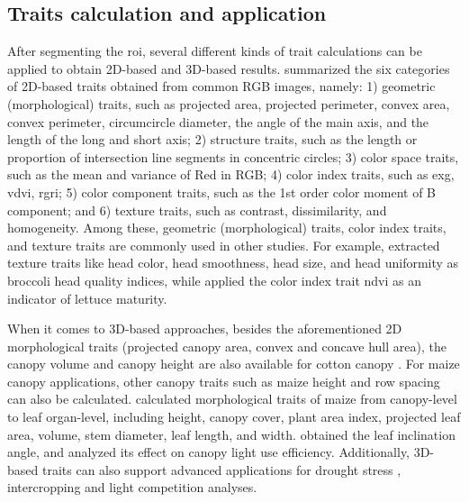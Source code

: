 \subsection{Traits calculation and application}

After segmenting the \gls{roi}, several different kinds of trait calculations can be applied to obtain 2D-based and 3D-based results. \citet[Table 1]{du_greenhouse_2021} summarized the six categories of 2D-based traits obtained from common RGB images, namely: 1) geometric (morphological) traits, such as projected area, projected perimeter, convex area, convex perimeter, circumcircle diameter, the angle of the main axis, and the length of the long and short axis; 2) structure traits, such as the length or proportion of intersection line segments in concentric circles; 3) color space traits, such as the mean and variance of Red in RGB; 4) color index traits, such as \gls{exg}, \gls{vdvi}, \gls{rgri}; 5) color component traits, such as the 1st order color moment of B component; and 6) texture traits, such as contrast, dissimilarity, and homogeneity. Among these, geometric (morphological) traits, color index traits, and texture traits are commonly used in other studies. For example, \citet{stansell_use_2017} extracted texture traits like head color, head smoothness, head size, and head uniformity as broccoli head quality indices, while \citet{bauer_combining_2019} applied the color index trait \gls{ndvi} as an indicator of lettuce maturity.

When it comes to 3D-based approaches, besides the aforementioned 2D morphological traits (projected canopy area, convex and concave hull area), the canopy volume and canopy height are also available for cotton canopy \citep{jiang_quantitative_2018}. For maize canopy applications, other canopy traits such as maize height \citep{hammerle_mobile_2018,qiu_field-based_2019} and row spacing \citep{qiu_field-based_2019} can also be calculated. \citet[Table 3]{jin_non-destructive_2020} calculated morphological traits of maize from canopy-level to leaf organ-level, including height, canopy cover, plant area index, projected leaf area, volume, stem diameter, leaf length, and width. \citet{itakura_automatic_2018} obtained the leaf inclination angle, and \citet{liu_canopy_2021} analyzed its effect on canopy light use efficiency. Additionally, 3D-based traits can also support advanced applications for drought stress \citep{su_evaluating_2019, sorrentino_lettuce_2020}, intercropping \citep{liu_field-based_2021} and light competition \citep{zhu_quantification_2020} analyses.

